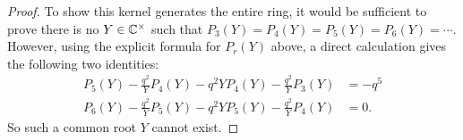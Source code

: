 \begin{proof}
  To show this kernel generates the entire ring, it would be sufficient to prove
  there is no $Y \in \mathbb C^\times$ such that $P_3(Y) = P_4(Y) = P_5(Y) = P_6(Y) = \dotsb$.
  However, using the explicit formula for $P_r(Y)$ above,
  a direct calculation gives the following two identities:
  \begin{align*}
    P_5(Y) - \frac{q^2}{Y} P_4(Y) - q^2 Y P_4(Y) - \frac{q^2}{Y} P_3(Y) &= -q^5 \\
    P_6(Y) - \frac{q^2}{Y} P_5(Y) - q^2 Y P_5(Y) - \frac{q^2}{Y} P_4(Y) &= 0.
  \end{align*}
  So such a common root $Y$ cannot exist.
\end{proof}
